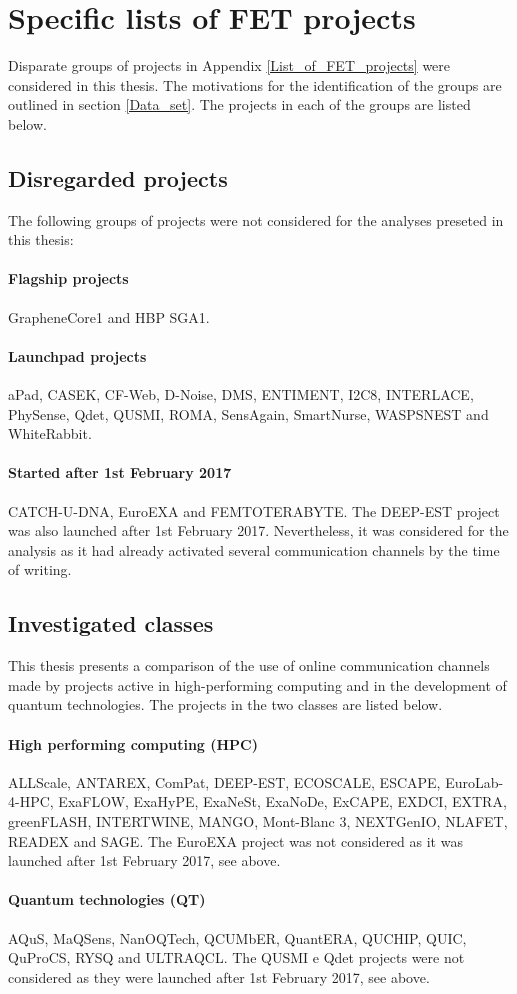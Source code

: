 \chapter{Specific lists of FET projects} \label{Specific_lists_of_FET_projects}
Disparate groups of projects in Appendix \ref{List_of_FET_projects} were considered in this thesis. The motivations for the identification of the groups are outlined in section \ref{Data_set}. The projects in each of the groups are listed below.

\section{Disregarded projects}
The following groups of projects were not considered for the analyses preseted in this thesis:

\subsubsection{Flagship projects}
GrapheneCore1 and HBP SGA1.

\subsubsection{Launchpad projects}
aPad, CASEK, CF-Web, D-Noise, DMS, ENTIMENT, I2C8, INTERLACE, PhySense, Qdet, QUSMI, ROMA, SensAgain, SmartNurse, WASPSNEST and WhiteRabbit.

\subsubsection{Started after 1st February 2017}
CATCH-U-DNA, EuroEXA and FEMTOTERABYTE. The DEEP-EST project was also launched after 1st February 2017. Nevertheless, it was considered for the analysis as it had already activated several communication channels by the time of writing.

\section{Investigated classes}
This thesis presents a comparison of the use of online communication channels made by projects active in high-performing computing and in the development of quantum technologies. The projects in the two classes are listed below. 

\subsubsection{High performing computing (HPC)}
ALLScale, ANTAREX, ComPat, DEEP-EST, ECOSCALE, ESCAPE, EuroLab-4-HPC, ExaFLOW, ExaHyPE, ExaNeSt, ExaNoDe, ExCAPE, EXDCI, EXTRA, greenFLASH, INTERTWINE, MANGO, Mont-Blanc 3, NEXTGenIO, NLAFET, READEX and SAGE. The  EuroEXA project was not considered as it was launched after 1st February 2017, see above.

\subsubsection{Quantum technologies (QT)}
AQuS, MaQSens, NanOQTech, QCUMbER, QuantERA, QUCHIP, QUIC, QuProCS, RYSQ and ULTRAQCL. The QUSMI e Qdet projects were not considered as they were launched after 1st February 2017, see above.